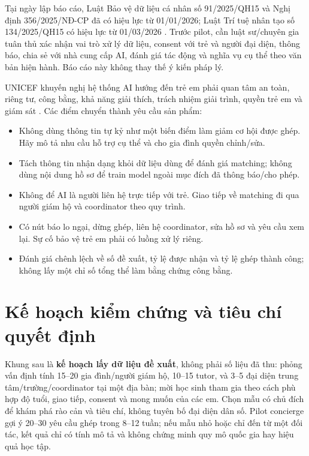 \documentclass[11pt,a4paper]{article}
\begin{document}
Tại ngày lập báo cáo, Luật Bảo vệ dữ liệu cá nhân số 91/2025/QH15 và Nghị định
356/2025/NĐ-CP đã có hiệu lực từ 01/01/2026; Luật Trí tuệ nhân tạo số
134/2025/QH15 có hiệu lực từ 01/03/2026 \cite{pdpl2025,decree356,ailaw2025}.
Trước pilot, cần luật sư/chuyên gia tuân thủ xác nhận vai trò xử lý dữ liệu,
consent với trẻ và người đại diện, thông báo, chia sẻ với nhà cung cấp AI,
đánh giá tác động và nghĩa vụ cụ thể theo văn bản hiện hành. Báo cáo này không
thay thế ý kiến pháp lý.

UNICEF khuyến nghị hệ thống AI hướng đến trẻ em phải quan tâm an toàn, riêng
tư, công bằng, khả năng giải thích, trách nhiệm giải trình, quyền trẻ em và
giám sát \cite{unicef2025ai}. Các điểm chuyển thành yêu cầu sản phẩm:

\begin{itemize}
  \item Không dùng thông tin tự kỷ như một biến điểm làm giảm cơ hội được ghép.
  Hãy mô tả nhu cầu hỗ trợ cụ thể và cho gia đình quyền chỉnh/sửa.
  \item Tách thông tin nhận dạng khỏi dữ liệu dùng để đánh giá matching; không
  dùng nội dung hồ sơ để train model ngoài mục đích đã thông báo/cho phép.
  \item Không để AI là người liên hệ trực tiếp với trẻ. Giao tiếp về matching
  đi qua người giám hộ và coordinator theo quy trình.
  \item Có nút báo lo ngại, dừng ghép, liên hệ coordinator, sửa hồ sơ và yêu
  cầu xem lại. Sự cố bảo vệ trẻ em phải có luồng xử lý riêng.
  \item Đánh giá chênh lệch về số đề xuất, tỷ lệ được nhận và tỷ lệ ghép thành
  công; không lấy một chỉ số tổng thể làm bằng chứng công bằng.
\end{itemize}

\section{Kế hoạch kiểm chứng và tiêu chí quyết định}

Khung sau là \textbf{kế hoạch lấy dữ liệu đề xuất}, không phải số liệu đã thu:
phỏng vấn định tính 15--20 gia đình/người giám hộ, 10--15 tutor, và 3--5
đại diện trung tâm/trường/coordinator tại một địa bàn; mời học sinh tham gia
theo cách phù hợp độ tuổi, giao tiếp, consent và mong muốn của các em. Chọn mẫu
có chủ đích để khám phá rào cản và tiêu chí, không tuyên bố đại diện dân số.
Pilot concierge gợi ý 20--30 yêu cầu ghép trong 8--12 tuần; nếu mẫu nhỏ hoặc
chỉ đến từ một đối tác, kết quả chỉ có tính mô tả và không chứng minh quy mô
quốc gia hay hiệu quả học tập.
\end{document}
